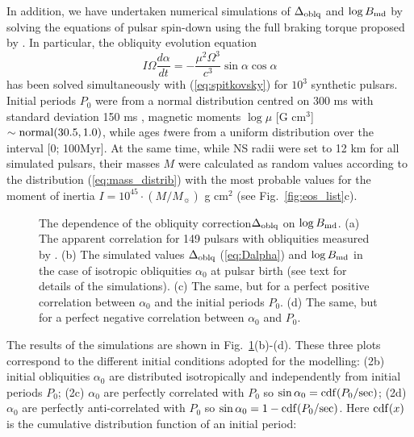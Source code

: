 \documentclass[fleqn,usenatbib]{mnras}
\begin{document}
In addition, we have undertaken numerical simulations of $\Delta_{\rm oblq}$ and $\log B_{\rm md}$ by solving the equations of pulsar spin-down using the full braking torque proposed by \cite{phil14}. In particular,
the obliquity evolution equation
\begin{equation}
	I\Omega\dfrac{d\alpha}{dt} = - \dfrac{\mu^2\Omega^3}{c^3}\sin\alpha\cos\alpha
	\label{eq:alpha_evolution}
\end{equation}
has been solved simultaneously with (\ref{eq:spitkovsky}) for $10^3$ synthetic pulsars.
Initial periods $P_0$ were from a normal distribution centred on 300 ms
with standard deviation 150 ms \citep{fgk06},
magnetic moments $\log \mu$
[G cm$^3$] $\sim {\rm normal}(30.5,
1.0)$, while ages
$t $were from a uniform distribution over the interval [0; 100Myr]. At
the same time, while NS radii were set to 12 km for all simulated
pulsars, their masses $M$ were calculated as random values according
to the distribution (\ref{eq:mass_distrib}) with the most probable values for the moment
of inertia $I = 10^{45} \cdot (M/M_{\sun})$ g cm$^2$ (see Fig.~\ref{fig:eos_list}c).

\begin{figure}
    {\centering {} \par}
    \caption{The dependence of the obliquity correction$\Delta_{\rm oblq}$ on $\log B_{\rm md}$.
(a) The apparent correlation for 149 pulsars with obliquities measured by
\citep{rankin93a}. (b) The simulated values $\Delta_{\rm oblq}$ (\ref{eq:Dalpha}) and $\log B_{\rm md}$ in the
case of isotropic obliquities $\alpha_0$ at pulsar birth (see text for details of the
simulations). (c) The same, but for a perfect positive correlation between $\alpha_0$
and the initial periods $P_0$. (d) The same, but for a perfect negative correlation
between $\alpha_0$ and $P_0$.}
    \label{fig:obliq_correlation}
\end{figure}

The results of the simulations are shown in Fig.~\ref{fig:obliq_correlation}(b)-(d). These
three plots correspond to the different initial conditions adopted for
the modelling: (2b) initial obliquities $\alpha_0$ are distributed isotropically
and independently from initial periods $P_0$; (2c) $\alpha_0$ are perfectly
correlated with $P_0$ so $\sin\alpha_0 = {\rm cdf}(P_0/{\rm sec})$; (2d) $\alpha_0$ are perfectly anti-correlated with $P_0$ so $\sin\alpha_0 = 1 - {\rm cdf}(P_0/{\rm sec})$. Here ${\rm cdf}(x)$ is
the cumulative distribution function of an initial period:
\end{document}
